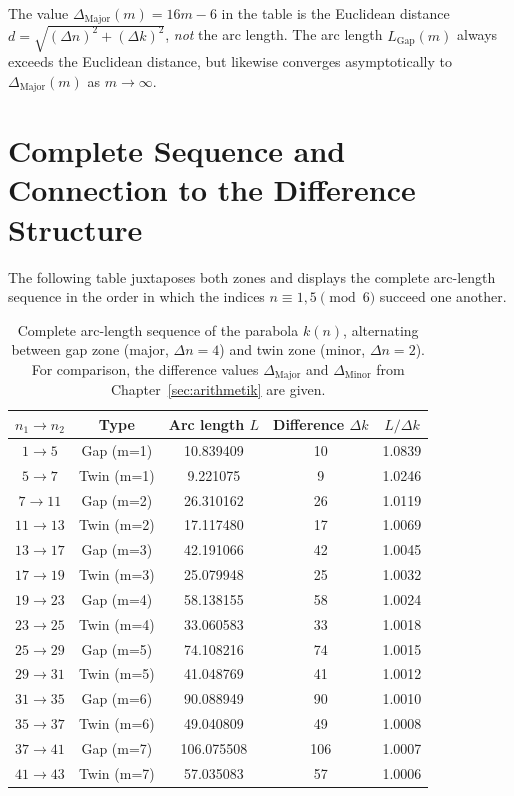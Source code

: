 \begin{remark}
The value $\Delta_{\mathrm{Major}}(m) = 16m-6$ in the table is the
Euclidean distance $d = \sqrt{(\Delta n)^2 + (\Delta k)^2}$, \emph{not}
the arc length. The arc length $L_{\mathrm{Gap}}(m)$ always exceeds the
Euclidean distance, but likewise converges asymptotically to
$\Delta_{\mathrm{Major}}(m)$ as $m \to \infty$.
\end{remark}

\section{Complete Sequence and Connection to the Difference Structure}
\label{sec:bl_gesamtsequenz}

The following table juxtaposes both zones and displays the complete
arc-length sequence in the order in which the indices $n \equiv 1,5 \pmod 6$
succeed one another.

\begin{table}[H]
\centering
\caption{Complete arc-length sequence of the parabola $k(n)$, alternating
  between gap zone (major, $\Delta n = 4$) and twin zone (minor, $\Delta n = 2$).
  For comparison, the difference values $\Delta_{\mathrm{Major}}$ and
  $\Delta_{\mathrm{Minor}}$ from Chapter~\ref{sec:arithmetik} are given.}
\renewcommand{\arraystretch}{1.25}
\begin{tabular}{ccccc}
\toprule
$n_1 \to n_2$ & Type & Arc length $L$ & Difference $\Delta k$ & $L / \Delta k$ \\
\midrule
 $1 \to  5$ & Gap  (m=1) & 10.839409 & 10 & 1.0839 \\
 $5 \to  7$ & Twin (m=1) &  9.221075 &  9 & 1.0246 \\
 $7 \to 11$ & Gap  (m=2) & 26.310162 & 26 & 1.0119 \\
$11 \to 13$ & Twin (m=2) & 17.117480 & 17 & 1.0069 \\
$13 \to 17$ & Gap  (m=3) & 42.191066 & 42 & 1.0045 \\
$17 \to 19$ & Twin (m=3) & 25.079948 & 25 & 1.0032 \\
$19 \to 23$ & Gap  (m=4) & 58.138155 & 58 & 1.0024 \\
$23 \to 25$ & Twin (m=4) & 33.060583 & 33 & 1.0018 \\
$25 \to 29$ & Gap  (m=5) & 74.108216 & 74 & 1.0015 \\
$29 \to 31$ & Twin (m=5) & 41.048769 & 41 & 1.0012 \\
$31 \to 35$ & Gap  (m=6) & 90.088949 & 90 & 1.0010 \\
$35 \to 37$ & Twin (m=6) & 49.040809 & 49 & 1.0008 \\
$37 \to 41$ & Gap  (m=7) & 106.075508 & 106 & 1.0007 \\
$41 \to 43$ & Twin (m=7) & 57.035083 & 57 & 1.0006 \\
\bottomrule
\end{tabular}
\end{table}

